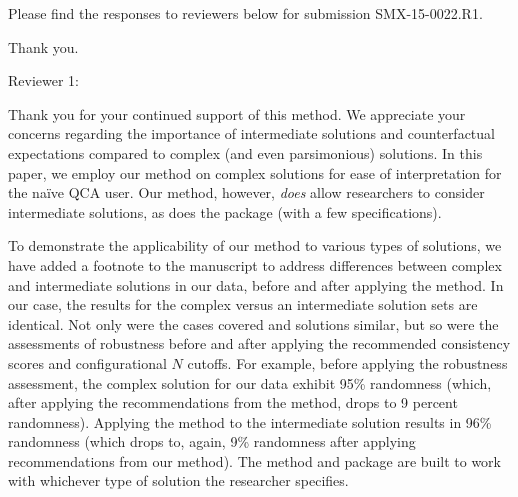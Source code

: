\documentclass[12pt,stdletter,dateno,sigleft]{newlfm} %
\begin{document}
\begin{newlfm}


Please find the responses to reviewers below for submission SMX-15-0022.R1. %

Thank you. \newline

Reviewer 1: 

Thank you for your continued support of this method. We appreciate your concerns regarding the importance of intermediate solutions and counterfactual expectations compared to complex (and even parsimonious) solutions. In this paper, we employ our method on complex solutions for ease of interpretation for the na{\"i}ve QCA user. Our method, however, \textit{does} allow researchers to consider intermediate solutions, as does the package (with a few specifications). 

To demonstrate the applicability of our method to various types of solutions, we have added a footnote to the manuscript to address differences between complex and intermediate solutions in our data, before and after applying the method. In our case, the results for the complex versus an intermediate solution sets are identical. Not only were the cases covered and solutions similar, but so were the assessments of robustness before and after applying the recommended consistency scores and configurational $N$ cutoffs. For example, before applying the robustness assessment, the complex solution for our data exhibit 95\% randomness (which, after applying the recommendations from the method, drops to 9 percent randomness). Applying the method to the intermediate solution results in 96\% randomness (which drops to, again, 9\% randomness after applying recommendations from our method). The method and package are built to work with whichever type of solution the researcher specifies. \newline


\end{newlfm}
\end{document}
